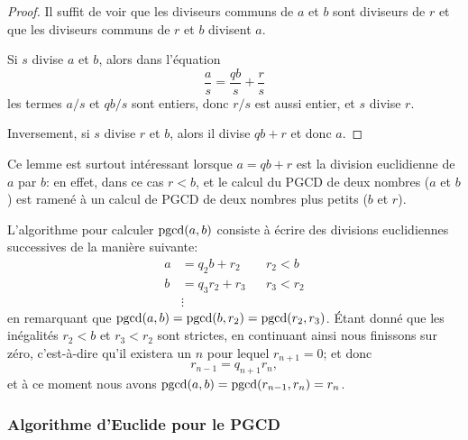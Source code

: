 \begin{proof}
    Il suffit de voir que les diviseurs communs de \( a\) et \( b\) sont diviseurs de \( r\) et que les diviseurs communs de \( r\) et \( b\) divisent \( a\).

    Si \( s\) divise \( a\) et \( b\), alors dans l'équation
    \begin{equation*}
        \frac{ a }{ s }=\frac{ qb }{ s }+\frac{ r }{ s }
    \end{equation*}
    les termes \( a/s\) et \( qb/s\) sont entiers, donc \( r/s\) est aussi entier, et \( s\) divise \( r\).

    Inversement, si \( s\) divise \( r\) et \( b\), alors il divise \( qb+r\) et donc \( a\).
\end{proof}
\begin{remark}
    Ce lemme est surtout intéressant lorsque \( a=qb+r\) est la division euclidienne de \( a\) par \( b\): en effet, dans ce cas \( r < b \), et le calcul du PGCD de deux nombres ($a$ et $b$) est ramené à un calcul de PGCD de deux nombres plus petits ($b$ et $r$).

    L'algorithme pour calculer \( \operatorname{pgcd}(a,b)\) consiste à écrire des divisions euclidiennes successives de la manière suivante:
    \begin{subequations}
        \begin{align}
            a &= q_2 b   + r_2 && r_2<b\\
            b &= q_3 r_2 + r_3 && r_3<r_2\\
            &\vdots
        \end{align}
    \end{subequations}
    en remarquant que \( \operatorname{pgcd}(a,b)=\operatorname{pgcd}(b,r_2)=\operatorname{pgcd}(r_2,r_3) \). Étant donné que les inégalités \( r_2<b\) et \( r_3<r_2\) sont strictes, en continuant ainsi nous finissons sur zéro, c'est-à-dire qu'il existera un $n$ pour lequel \( r_{n+1} = 0 \); et donc
\begin{equation*}
    r_{n-1}=q_{n+1}r_n,
\end{equation*}
et à ce moment nous avons \( \operatorname{pgcd}(a,b)=\operatorname{pgcd}(r_{n-1},r_n)=r_n\).
\end{remark}

\subsubsection{Algorithme d'Euclide pour le PGCD}
\label{SUBSECooAEBLooFGJRkg}


